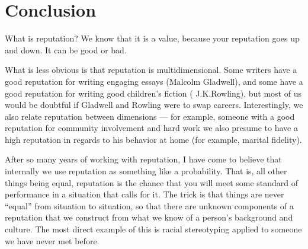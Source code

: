 \section{Conclusion}

\begin{comment}
Used to filter too much information, as in page rank.
But also used to encourage desirable behavior
(and discourage undesirable behavior).

Does a vandal to Wikipedia care that his reputation is
tarnished?  What kind of punishment is this?

Applications: peer review, text trust, sexual offender registry, job references.
Can we use reputation to figure out whether people
fit into a company culture?

What if web search rankings were done incrementally
instead of globally?  Would this give higher reputation
to \textit{fresh} parts of the web, and gracefully
phase out crufty parts?  Crucial to this would be the
need to update reputation based on page views, or
people following links from Facebook/Google, so that
we know that a static page is still actually relevant.
\end{comment}

What is reputation?  We know that it is a value, because your reputation goes
up and down. It can be good or bad.

What is less obvious is that reputation is multidimensional.  Some writers have
a good reputation for writing engaging essays (\eg Malcolm Gladwell), and some
have a good reputation for writing good children's fiction (\eg
J.\thinspace K.\thinspace Rowling),
but most of us would be doubtful if Gladwell and Rowling were to swap careers.
Interestingly, we also relate reputation between
dimensions --- for example, someone
with a good reputation for community involvement and hard work we also presume
to have a high reputation in regards to his behavior at home (for example,
marital fidelity).

After so many years of working with reputation, I have come to believe that
internally we use reputation as something like a probability. That is, all
other things being equal, reputation is the chance that you will meet some
standard of performance in a situation that calls for it.  The trick is that
things are never ``equal'' from situation to situation, so that there are
unknown components of a reputation that we construct from what
we know of a person's background and culture.
The most direct example of this is racial stereotyping applied to
someone we have never met before.

